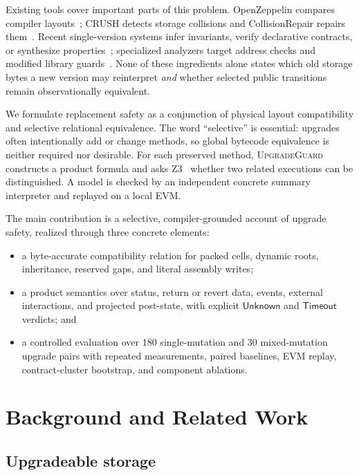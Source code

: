 \documentclass[runningheads]{llncs}
\newcommand{\tool}{\textsc{UpgradeGuard}\xspace}
\newcommand{\Unknown}{\mathsf{Unknown}}
\newcommand{\Timeout}{\mathsf{Timeout}}
\begin{document}
Existing tools cover important parts of this problem.  OpenZeppelin compares compiler layouts~\cite{openzeppelin2025upgrades}; CRUSH detects storage collisions and CollisionRepair repairs them~\cite{ruaro2024crush,pan2025collisionrepair}. Recent single-version systems infer invariants, verify declarative contracts, or synthesize properties~\cite{chen2024invariants,chen2024dcv,liu2025propertygpt}; specialized analyzers target address checks and modified library guards~\cite{sun2024avverifier,liu2024zepscope}.  None of these ingredients alone states which old storage bytes a new version may reinterpret \emph{and} whether selected public transitions remain observationally equivalent.

We formulate replacement safety as a conjunction of physical layout compatibility and selective relational equivalence.  The word ``selective'' is essential: upgrades often intentionally add or change methods, so global bytecode equivalence is neither required nor desirable.  For each preserved method, \tool constructs a product formula and asks Z3~\cite{demoura2008z3} whether two related executions can be distinguished.  A model is checked by an independent concrete summary interpreter and replayed on a local EVM.

The main contribution is a selective, compiler-grounded account of upgrade safety, realized through three concrete elements:
\begin{itemize}
\item a byte-accurate compatibility relation for packed cells, dynamic roots, inheritance, reserved gaps, and literal assembly writes;
\item a product semantics over status, return or revert data, events, external interactions, and projected post-state, with explicit \(\Unknown\) and \(\Timeout\) verdicts; and
\item a controlled evaluation over 180 single-mutation and 30 mixed-mutation upgrade pairs with repeated measurements, paired baselines, EVM replay, contract-cluster bootstrap, and component ablations.
\end{itemize}

\section{Background and Related Work}
\label{sec:related}

\subsection{Upgradeable storage}
\end{document}
